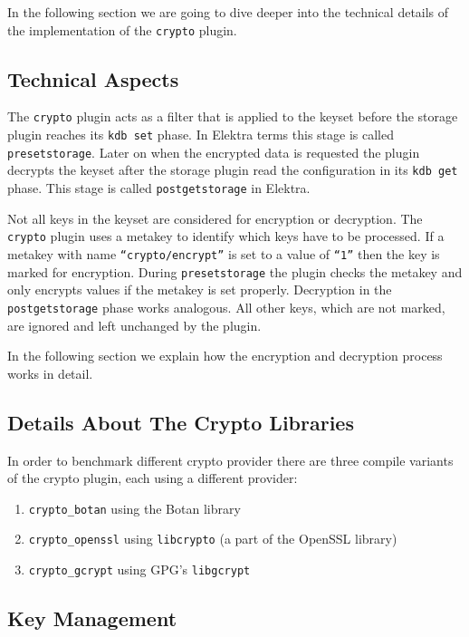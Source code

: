 In the following section we are going to dive deeper into the technical details of the implementation of the \texttt{crypto} plugin.

\subsection{Technical Aspects}

The \texttt{crypto} plugin acts as a filter that is applied to the keyset before the storage plugin reaches its \texttt{kdb set} phase.
In Elektra terms this stage is called \texttt{presetstorage}.
Later on when the encrypted data is requested the plugin decrypts the keyset after the storage plugin read the configuration in its \texttt{kdb get} phase.
This stage is called \texttt{postgetstorage} in Elektra.

Not all keys in the keyset are considered for encryption or decryption.
The \texttt{crypto} plugin uses a metakey to identify which keys have to be processed.
If a metakey with name \texttt{``crypto/encrypt''} is set to a value of \texttt{``1''} then the key is marked for encryption.
During \texttt{presetstorage} the plugin checks the metakey and only encrypts values if the metakey is set properly.
Decryption in the \texttt{postgetstorage} phase works analogous.
All other keys, which are not marked, are ignored and left unchanged by the plugin.

In the following section we explain how the encryption and decryption process works in detail.

\subsection{Details About The Crypto Libraries}\label{details-about-the-crypto-libraries}

In order to benchmark different crypto provider there are three compile
variants of the crypto plugin, each using a different provider:

\begin{enumerate}
\def\labelenumi{\arabic{enumi}.}
\tightlist
\item
  \texttt{crypto\_botan} using the Botan library
\item
  \texttt{crypto\_openssl} using \texttt{libcrypto} (a part of the
  OpenSSL library)
\item
  \texttt{crypto\_gcrypt} using GPG's \texttt{libgcrypt}
\end{enumerate}

\subsection{Key Management}\label{key-management}

